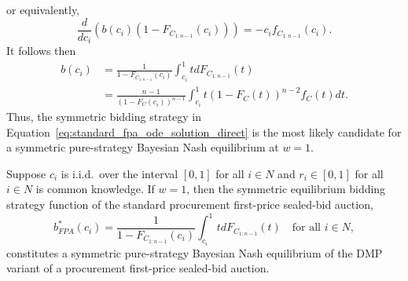or equivalently,
\begin{equation}
	\frac{d}{dc_i}(b(c_i)(1 - F_{C_{1:n-1}}(c_i))) = -c_if_{C_{1:n-1}}(c_i).
\end{equation}
 It follows then
\begin{align}
	\label{eq:standard_fpa_ode_solution_direct}
	b(c_i) &= \frac{1}{1 - F_{C_{1:n-1}}(c_i)}\int_{c_i}^{1} tdF_{C_{1:n-1}}(t) \nonumber\\
	&= \frac{n-1}{(1 - F_{C}(c_i))^{n-1}}\int_{c_i}^1 t(1-F_C(t))^{n-2}f_C(t)dt.
\end{align}
Thus, the symmetric bidding strategy in Equation~\eqref{eq:standard_fpa_ode_solution_direct} is the most likely candidate for a symmetric pure-strategy Bayesian Nash equilibrium at $w=1$.
\begin{proposition}
\label{prop:special_case_w_1_direct}
Suppose $c_i$ is i.i.d.~over the interval $[0,1]$ for all $i\in N$ and $r_i \in [0,1]$ for all $i\in N$ is common knowledge. If $w=1$, then the symmetric equilibrium bidding strategy function of the standard procurement first-price sealed-bid auction,
\begin{equation}
	\label{eq:standard_fpa_direct}
	b^*_{FPA}(c_i) = \frac{1}{1 - F_{C_{1:n-1}}(c_i)}\int_{c_i}^{1} tdF_{C_{1:n-1}}(t) \quad\text{for all } i\in N,
\end{equation}
constitutes a symmetric pure-strategy Bayesian Nash equilibrium of the DMP variant of a procurement first-price sealed-bid auction.
\end{proposition}

